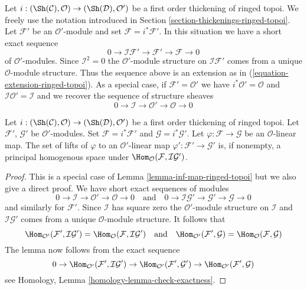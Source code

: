 \noindent
Let $i : (\Sh(\mathcal{C}), \mathcal{O}) \to (\Sh(\mathcal{D}), \mathcal{O}')$
be a first order thickening of ringed topoi. We freely use the notation
introduced in Section \ref{section-thickenings-ringed-topoi}.
Let $\mathcal{F}'$ be an $\mathcal{O}'$-module
and set $\mathcal{F} = i^*\mathcal{F}'$.
In this situation we have a short exact sequence
$$
0 \to \mathcal{I}\mathcal{F}' \to \mathcal{F}' \to \mathcal{F} \to 0
$$
of $\mathcal{O}'$-modules. Since $\mathcal{I}^2 = 0$ the
$\mathcal{O}'$-module structure on $\mathcal{I}\mathcal{F}'$
comes from a unique $\mathcal{O}$-module structure.
Thus the sequence above is an extension as in
(\ref{equation-extension-ringed-topoi}).
As a special case, if $\mathcal{F}' = \mathcal{O}'$ we have
$i^*\mathcal{O}' = \mathcal{O}$ and
$\mathcal{I}\mathcal{O}' = \mathcal{I}$ and we recover the
sequence of structure sheaves
$$
0 \to \mathcal{I} \to \mathcal{O}' \to \mathcal{O} \to 0
$$

\begin{lemma}
\label{lemma-inf-map-special-ringed-topoi}
Let $i : (\Sh(\mathcal{C}), \mathcal{O}) \to (\Sh(\mathcal{D}), \mathcal{O}')$
be a first order thickening of ringed topoi.
Let $\mathcal{F}'$, $\mathcal{G}'$ be $\mathcal{O}'$-modules.
Set $\mathcal{F} = i^*\mathcal{F}'$ and $\mathcal{G} = i^*\mathcal{G}'$.
Let $\varphi : \mathcal{F} \to \mathcal{G}$ be an $\mathcal{O}$-linear map.
The set of lifts of $\varphi$ to an $\mathcal{O}'$-linear map
$\varphi' : \mathcal{F}' \to \mathcal{G}'$ is, if nonempty, a principal
homogenous space under
$\Hom_\mathcal{O}(\mathcal{F}, \mathcal{I}\mathcal{G}')$.
\end{lemma}

\begin{proof}
This is a special case of Lemma \ref{lemma-inf-map-ringed-topoi} but we also
give a direct proof. We have short exact sequences of modules
$$
0 \to \mathcal{I} \to \mathcal{O}' \to \mathcal{O} \to 0
\quad\text{and}\quad
0 \to \mathcal{I}\mathcal{G}' \to \mathcal{G}' \to \mathcal{G} \to 0
$$
and similarly for $\mathcal{F}'$.
Since $\mathcal{I}$ has square zero the $\mathcal{O}'$-module
structure on $\mathcal{I}$ and $\mathcal{I}\mathcal{G}'$ comes from
a unique $\mathcal{O}$-module structure. It follows that
$$
\Hom_{\mathcal{O}'}(\mathcal{F}', \mathcal{I}\mathcal{G}') =
\Hom_\mathcal{O}(\mathcal{F}, \mathcal{I}\mathcal{G}')
\quad\text{and}\quad
\Hom_{\mathcal{O}'}(\mathcal{F}', \mathcal{G}) =
\Hom_\mathcal{O}(\mathcal{F}, \mathcal{G})
$$
The lemma now follows from the exact sequence
$$
0 \to \Hom_{\mathcal{O}'}(\mathcal{F}', \mathcal{I}\mathcal{G}') \to
\Hom_{\mathcal{O}'}(\mathcal{F}', \mathcal{G}') \to
\Hom_{\mathcal{O}'}(\mathcal{F}', \mathcal{G})
$$
see Homology, Lemma \ref{homology-lemma-check-exactness}.
\end{proof}

